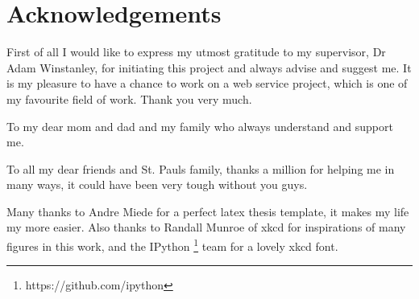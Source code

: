 

%


\begingroup

\let\clearpage\relax
\let\cleardoublepage\relax
\let\cleardoublepage\relax

\chapter*{Acknowledgements} %

First of all I would like to express my utmost gratitude to my supervisor,
Dr Adam Winstanley, for initiating this project and always advise
and suggest me. It is my pleasure to have a chance to work on
a web service project, which is one of my favourite field of work.
Thank you very much.

To my dear mom and dad and my family who always understand and support me.

To all my dear friends and St. Pauls family, thanks a million for
helping me in many ways, it could have been very tough without you guys.

Many thanks to Andre Miede for a perfect latex thesis template,
it makes my life my more easier. Also thanks to Randall Munroe of xkcd
for inspirations of many figures in this work, and the
IPython \footnote{https://github.com/ipython} team for a lovely
xkcd font.

\endgroup
